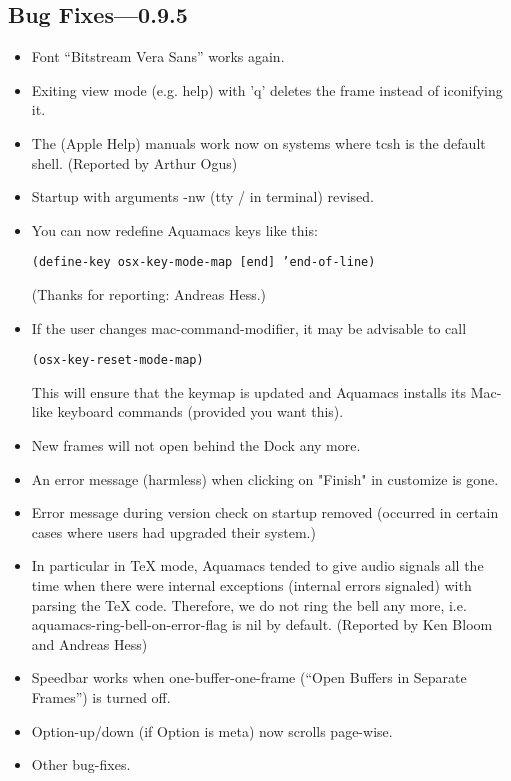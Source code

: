 \subsection{Bug Fixes---0.9.5}


\begin{itemize}



\item Font ``Bitstream Vera Sans'' works again.


\item Exiting view mode (e.g. help) with 'q' deletes the frame instead of
        iconifying it.

\item The (Apple Help) manuals work now on systems where tcsh
        is the default shell.  (Reported by Arthur Ogus)


\item Startup with arguments -nw (tty / in terminal) revised.



\item You can now redefine Aquamacs keys like this:

        \texttt{(define-key osx-key-mode-map [end] 'end-of-line)}

        (Thanks for reporting: Andreas Hess.)

\item If the user changes mac-command-modifier, it may be advisable to call

         \texttt{(osx-key-reset-mode-map)}

        This will ensure that the keymap is updated and Aquamacs installs
        its Mac-like keyboard commands (provided you want this).

\item New frames will not open behind the Dock any more.


\item An error message (harmless) when clicking on "Finish" in customize is gone.

\item Error message during version check on startup removed (occurred in
        certain cases where users had upgraded their system.)

\item In particular in TeX mode, Aquamacs tended to give audio signals all the
        time when there were internal exceptions (internal errors signaled) with parsing the TeX code. Therefore, we do not ring the bell any more,
        i.e. aquamacs-ring-bell-on-error-flag is nil by default.
        (Reported by Ken Bloom and Andreas Hess)
\item Speedbar works when one-buffer-one-frame (``Open Buffers in Separate
        Frames'') is turned off.
\item Option-up/down (if Option is meta) now scrolls page-wise.


\item Other bug-fixes.

\end{itemize}

